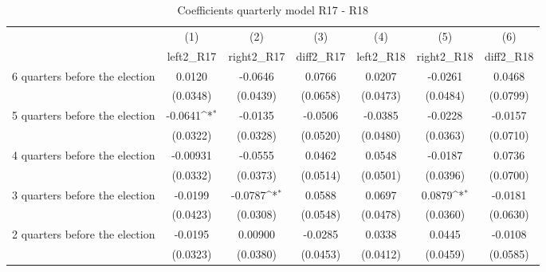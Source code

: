 \begin{table}[!ht]\centering \footnotesize
\def\sym#1{\ifmmode^{#1}\else\(^{#1}\)\fi}
\caption{Coefficients quarterly model R17 - R18}
\begin{tabular}{l*{6}{c}}
\hline\hline
                    &\multicolumn{1}{c}{(1)}&\multicolumn{1}{c}{(2)}&\multicolumn{1}{c}{(3)}&\multicolumn{1}{c}{(4)}&\multicolumn{1}{c}{(5)}&\multicolumn{1}{c}{(6)}\\
                    &\multicolumn{1}{c}{left2\_R17}&\multicolumn{1}{c}{right2\_R17}&\multicolumn{1}{c}{diff2\_R17}&\multicolumn{1}{c}{left2\_R18}&\multicolumn{1}{c}{right2\_R18}&\multicolumn{1}{c}{diff2\_R18}\\
\hline
 6 quarters before the election&      0.0120         &     -0.0646         &      0.0766         &      0.0207         &     -0.0261         &      0.0468         \\
                    &    (0.0348)         &    (0.0439)         &    (0.0658)         &    (0.0473)         &    (0.0484)         &    (0.0799)         \\
[1em]
 5 quarters before the election&     -0.0641\sym{*}  &     -0.0135         &     -0.0506         &     -0.0385         &     -0.0228         &     -0.0157         \\
                    &    (0.0322)         &    (0.0328)         &    (0.0520)         &    (0.0480)         &    (0.0363)         &    (0.0710)         \\
[1em]
 4 quarters before the election&    -0.00931         &     -0.0555         &      0.0462         &      0.0548         &     -0.0187         &      0.0736         \\
                    &    (0.0332)         &    (0.0373)         &    (0.0514)         &    (0.0501)         &    (0.0396)         &    (0.0700)         \\
[1em]
 3 quarters before the election&     -0.0199         &     -0.0787\sym{*}  &      0.0588         &      0.0697         &      0.0879\sym{*}  &     -0.0181         \\
                    &    (0.0423)         &    (0.0308)         &    (0.0548)         &    (0.0478)         &    (0.0360)         &    (0.0630)         \\
[1em]
 2 quarters before the election&     -0.0195         &     0.00900         &     -0.0285         &      0.0338         &      0.0445         &     -0.0108         \\
                    &    (0.0323)         &    (0.0380)         &    (0.0453)         &    (0.0412)         &    (0.0459)         &    (0.0585)         \\

\end{tabular}
\end{table}
